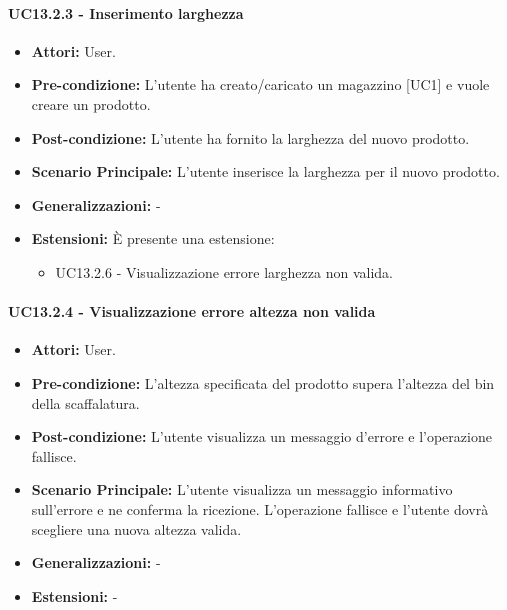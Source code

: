 \paragraph{UC13.2.3 - Inserimento larghezza}
\begin{itemize}
    \item \textbf{Attori:} User.
    \item \textbf{Pre-condizione:}  L'utente ha creato/caricato un magazzino [UC1] e vuole creare un prodotto.
    \item \textbf{Post-condizione:} L'utente ha fornito la larghezza del nuovo prodotto.
    \item \textbf{Scenario Principale:}  L'utente inserisce la larghezza per il nuovo prodotto.
    \item \textbf{Generalizzazioni:} -
    \item \textbf{Estensioni:} È presente una estensione:
    \begin{itemize}
        \item UC13.2.6 - Visualizzazione errore larghezza non valida.
    \end{itemize}
\end{itemize}


\paragraph{UC13.2.4 - Visualizzazione errore altezza non valida}
\begin{itemize}
    \item \textbf{Attori:} User.
    \item \textbf{Pre-condizione:}  L'altezza specificata del prodotto supera l'altezza del bin della scaffalatura.
    \item \textbf{Post-condizione:} L'utente visualizza un messaggio d'errore e l'operazione fallisce.
    \item \textbf{Scenario Principale:}  L'utente visualizza un messaggio informativo sull'errore e ne conferma la ricezione. L'operazione fallisce e l'utente dovrà scegliere una nuova altezza valida.
    \item \textbf{Generalizzazioni:} -
    \item \textbf{Estensioni:} -
\end{itemize}


